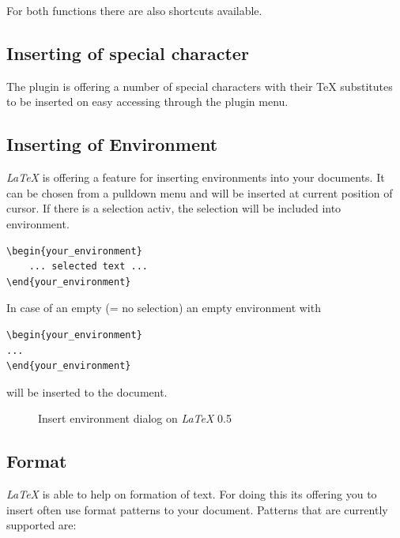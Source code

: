 \documentclass[%
paper=a4,%
fontsize=11pt,%
twoside=false,%
DIV18,%
headsepline,%
plainheadsepline,%
footsepline,%
plainfootsepline,%
bibliography=totoc,%
listof=totoc,%
BCOR10mm,%
parskip=half,%
openany,%
]{scrreprt}
\begin{document}
For both functions there are also shortcuts available.

\subsection{Inserting of special character}
The plugin is offering a number of special characters with their \TeX{}
substitutes to be inserted on easy accessing through the plugin menu.

\subsection{Inserting of Environment}
\textit{LaTeX} is offering a feature for inserting environments into your
documents. It can be chosen from a pulldown menu and will be inserted at
current position of cursor. If there is a selection activ, the selection
will be included into environment.

\begin{lstlisting}
\begin{your_environment}
    ... selected text ...
\end{your_environment}
\end{lstlisting}

In case of an empty (= no selection) an empty environment with

\begin{lstlisting}
\begin{your_environment}
...
\end{your_environment}
\end{lstlisting}


will be inserted to the document.

\begin{figure}[h!]
    \caption{Insert environment dialog on \textit{LaTeX} 0.5}
\end{figure}


\subsection{Format}
\textit{LaTeX} is able to help on formation of text. For doing this its
offering you to insert often use format patterns to your document.
Patterns that are currently supported are:
\end{document}
